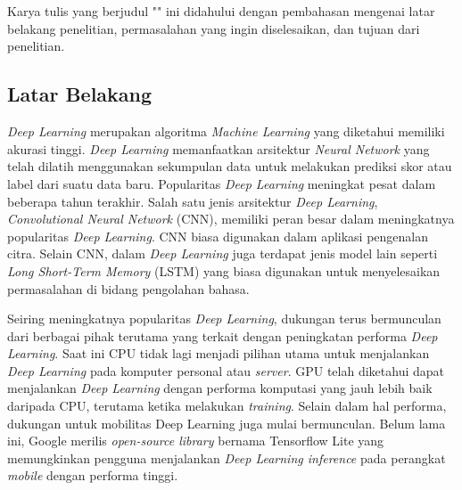 \chapter{\babSatu}
Karya tulis yang berjudul "\judul" ini didahului dengan pembahasan mengenai latar belakang penelitian, permasalahan yang ingin diselesaikan, dan tujuan dari penelitian.

\section{Latar Belakang}
\textit{Deep Learning} merupakan algoritma \textit{Machine Learning} yang diketahui memiliki akurasi tinggi. \textit{Deep Learning} memanfaatkan arsitektur \textit{Neural Network} yang telah dilatih menggunakan sekumpulan data untuk melakukan prediksi skor atau label dari suatu data baru. Popularitas \textit{Deep Learning} meningkat pesat dalam beberapa tahun terakhir. Salah satu jenis arsitektur \textit{Deep Learning}, \textit{Convolutional Neural Network} (CNN), memiliki peran besar dalam meningkatnya popularitas \textit{Deep Learning}. CNN biasa digunakan dalam aplikasi pengenalan citra. Selain CNN, dalam \textit{Deep Learning} juga terdapat jenis model lain seperti \textit{Long Short-Term Memory} (LSTM) yang biasa digunakan untuk menyelesaikan permasalahan di bidang pengolahan bahasa.

Seiring meningkatnya popularitas \textit{Deep Learning}, dukungan terus bermunculan dari berbagai pihak terutama yang terkait dengan peningkatan performa \textit{Deep Learning}. Saat ini CPU tidak lagi menjadi pilihan utama untuk menjalankan \textit{Deep Learning} pada komputer personal atau \textit{server}. GPU telah diketahui dapat menjalankan \textit{Deep Learning} dengan performa komputasi yang jauh lebih baik daripada CPU, terutama ketika melakukan \textit{training}. Selain dalam hal performa, dukungan untuk mobilitas Deep Learning juga mulai bermunculan. Belum lama ini, Google merilis \textit{open-source library} bernama Tensorflow Lite \cite{tflite} yang memungkinkan pengguna menjalankan \textit{Deep Learning inference} pada perangkat \textit{mobile} dengan performa tinggi.


